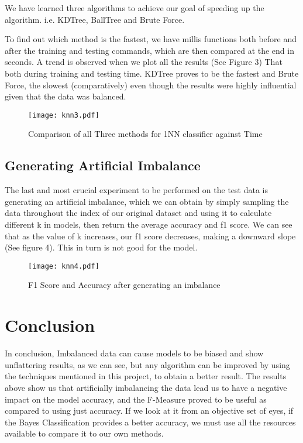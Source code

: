 \documentclass{article}
\begin{document}
We have learned three algorithms to achieve our goal of speeding up the algorithm. i.e. KDTree, BallTree and Brute Force.

To find out which method is the fastest, we have millis functions both before and after the training and testing commands, which are then compared at the end in seconds.
A trend is observed when we plot all the results (See Figure 3) That both during training and testing time. KDTree proves to be the fastest and Brute Force, the slowest (comparatively) even though the results were highly influential given that the data was balanced.
\begin{figure}[ht]
\vskip 0.1in
\begin{center}
\centerline{\texttt{[image: knn3.pdf]}}
\caption{Comparison of all Three methods for 1NN classifier against Time}
\label{icml-historical}
\end{center}
\vskip -0.2in
\end{figure}


\subsection{Generating Artificial Imbalance}
The last and most crucial experiment to be performed on the test data is generating an artificial imbalance, which we can obtain by simply sampling the data throughout the index of our original dataset and using it to calculate different k in models, then return the average accuracy and f1 score.
We can see that as the value of k increases, our f1 score decreases, making a downward slope (See figure 4). This in turn is not good for the model.

\begin{figure}[ht]
\vskip 0.1in
\begin{center}
\centerline{\texttt{[image: knn4.pdf]}}
\caption{F1 Score and Accuracy after generating an imbalance
}
\label{icml-historical}
\end{center}
\vskip -0.2in
\end{figure}

\section{Conclusion}
In conclusion, Imbalanced data can cause models to be biased and show unflattering results, as we can see, but any algorithm can be improved by using the techniques mentioned in this project, to obtain a better result. The results above show us that artificially imbalancing the data lead us to have a negative impact on the model accuracy, and the F-Measure proved to be useful as compared to using just accuracy.
If we look at it from an objective set of eyes, if the Bayes Classification provides a better accuracy, we must use all the resources available to compare it to our own methods. 
\end{document}

